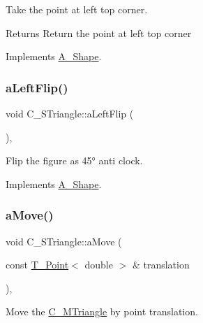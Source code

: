 Take the point at left top corner. 

\begin{DoxyReturn}{Returns}
Return the point at left top corner 
\end{DoxyReturn}


Implements \hyperlink{classA__Shape_abe6781b13037bf7ecea8ff9456b31533}{A\+\_\+\+Shape}.

\mbox{\label{classC__STriangle_aff480b9ec706ee5ae58f6f78318e2728}} 
\subsubsection{\texorpdfstring{a\+Left\+Flip()}{aLeftFlip()}}
{\footnotesize\ttfamily void C\+\_\+\+S\+Triangle\+::a\+Left\+Flip (\begin{DoxyParamCaption}{ }\end{DoxyParamCaption})\hspace{0.3cm}{\ttfamily [override]}, {\ttfamily [virtual]}}



Flip the figure as 45° anti clock. 



Implements \hyperlink{classA__Shape_abe947e7003cb63be2b4f6c439533427d}{A\+\_\+\+Shape}.

\mbox{\label{classC__STriangle_a82a3c3a847ca6c2d5922921150fa50b5}} 
\subsubsection{\texorpdfstring{a\+Move()}{aMove()}}
{\footnotesize\ttfamily void C\+\_\+\+S\+Triangle\+::a\+Move (\begin{DoxyParamCaption}\item[{const \hyperlink{classT__Point}{T\+\_\+\+Point}$<$ double $>$ \&}]{translation }\end{DoxyParamCaption})\hspace{0.3cm}{\ttfamily [override]}, {\ttfamily [virtual]}}



Move the \hyperlink{classC__MTriangle}{C\+\_\+\+M\+Triangle} by point translation. 


